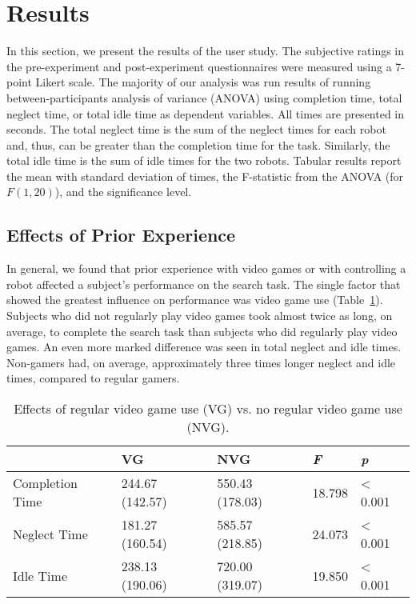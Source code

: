 \section{Results}
\label{sec:study-results}
In this section, we present the results of the user study. The subjective ratings in the pre-experiment and post-experiment questionnaires were measured using a 7-point Likert scale. The majority of our analysis was run results of running between-participants analysis of variance (ANOVA) using completion time, total neglect time, or total idle time as dependent variables. All times are presented in seconds. The total neglect time is the sum of the neglect times for each robot and, thus, can be greater than the completion time for the task. Similarly, the total idle time is the sum of idle times for the two robots. Tabular results report the mean with standard deviation of times, the F-statistic from the ANOVA (for $F(1, 20)$), and the significance level.

\subsection{Effects of Prior Experience} %
\label{sub:effects_of_prior_experience}
In general, we found that prior experience with video games or with controlling a robot affected a subject’s performance on the search task.
The single factor that showed the greatest influence on performance was video game use (Table~\ref{tab:prior-vg}). Subjects who did not regularly play video games took almost twice as long, on average, to complete the search task than subjects who did regularly play video games. An even more marked difference was seen in total neglect and idle times. Non-gamers had, on average, approximately three times longer neglect and idle times, compared to regular gamers.


\begin{table}[ht]
\label{tab:prior-vg}
\begin{center}
	\begin{tabular}{| l | l | l | l | l |}
	\hline
		& \textbf{VG} & \textbf{NVG} & \emph{F} & \emph{p}\\ \hline
		Completion Time & 244.67 (142.57) & 550.43 (178.03) & 18.798 & < 0.001\\ \hline
		Neglect Time & 181.27 (160.54) & 585.57 (218.85) & 24.073 & < 0.001\\ \hline
		Idle Time & 238.13 (190.06) & 720.00 (319.07) & 19.850 & < 0.001\\ \hline
	\hline
	\end{tabular}
	\caption{Effects of regular video game use (VG) vs. no regular video game use (NVG).}
\end{center}
\end{table}


